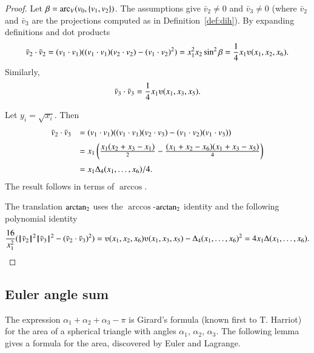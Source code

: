 \begin{proof}
Let $\beta = \operatorname{arc}_V(v_0,\{v_1,v_2\})$.
The assumptions give $\bar v_2\ne 0$ and $\bar v_3 \ne 0$ (where $\bar v_2$ and
$\bar v_3$ are the projections computed as in Definition~\ref{def:dih}).  
%
    By expanding definitions and dot products
    $$
    \bar v_2\cdot \bar v_2 = (v_1\cdot v_1) ((v_1\cdot v_1)(v_2\cdot v_2) -
    (v_1\cdot v_2)^2) =  x_1^2 x_2 \sin^2 \beta = \frac{1}{4}
    x_1
    \ups(x_1,x_2,x_6).
    $$
    Similarly,
    $$\bar v_3 \cdot \bar v_3 = \frac{1}{4} x_1 \ups(x_1,x_3,x_5).$$

Let $y_i = \sqrt{x_i}$. Then
    $$\begin{array}{lll}
    \bar v_2\cdot \bar v_3 &= (v_1\cdot v_1)((v_1\cdot v_1)(v_2\cdot v_3) -
    (v_1\cdot v_2)(v_1\cdot v_3) ) \vspace{6pt} \\  &
    = x_1 \left(\frac{\displaystyle x_1 (x_2 + x_3 -
    x_1)}{2} - \frac{\displaystyle (x_1 + x_2 - x_6)(x_1 + x_3 -
    x_5)}{4} \right)\vspace{6pt}\\&
    = {x_1\Delta_4(x_1,\ldots,x_6)}/{4}.
    \end{array}
    $$
The result follows in terms of $\arccos$.

The translation ${\operatorname{arctan_2}}$ uses the $\arccos$-${\operatorname{arctan_2}}$ identity
and the following polynomial identity
    $$
    \frac{16}{x_1^2}(\normo{\bar v_2}^2 \normo{\bar v_3}^2 - (\bar v_2\cdot \bar v_3)^2) =
    \ups(x_1,x_2,x_6)\ups(x_1,x_3,x_5) - \Delta_4(x_1,\ldots,x_6)^2
    = 4 x_1 \Delta(x_1,\ldots,x_6).
    $$
\end{proof}






\subsection{Euler angle sum}

The expression $\alpha_1+\alpha_2+\alpha_3-\pi$ is Girard's
formula (known first to T. Harriot) 
for the area of a spherical triangle with angles
$\alpha_1$, $\alpha_2$, $\alpha_3$.  The following lemma
gives a formula for the area, discovered by
Euler and Lagrange.
%
%
%
%
%

